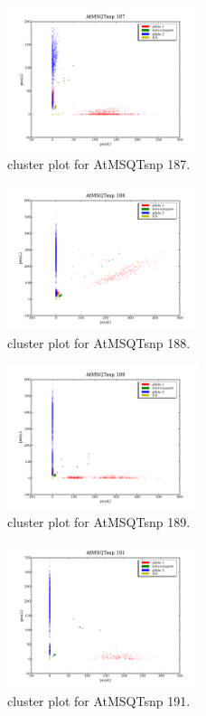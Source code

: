 \begin{figure}[H]
\includegraphics[width=0.5\textwidth]{figures/cluster_plot_AtMSQTsnp_187.png}
\caption{cluster plot for AtMSQTsnp 187.} \label{flAtMSQTsnp187}
\end{figure}

\begin{figure}[H]
\includegraphics[width=0.5\textwidth]{figures/cluster_plot_AtMSQTsnp_188.png}
\caption{cluster plot for AtMSQTsnp 188.} \label{flAtMSQTsnp188}
\end{figure}

\begin{figure}[H]
\includegraphics[width=0.5\textwidth]{figures/cluster_plot_AtMSQTsnp_189.png}
\caption{cluster plot for AtMSQTsnp 189.} \label{flAtMSQTsnp189}
\end{figure}

\begin{figure}[H]
\includegraphics[width=0.5\textwidth]{figures/cluster_plot_AtMSQTsnp_191.png}
\caption{cluster plot for AtMSQTsnp 191.} \label{flAtMSQTsnp191}
\end{figure}


